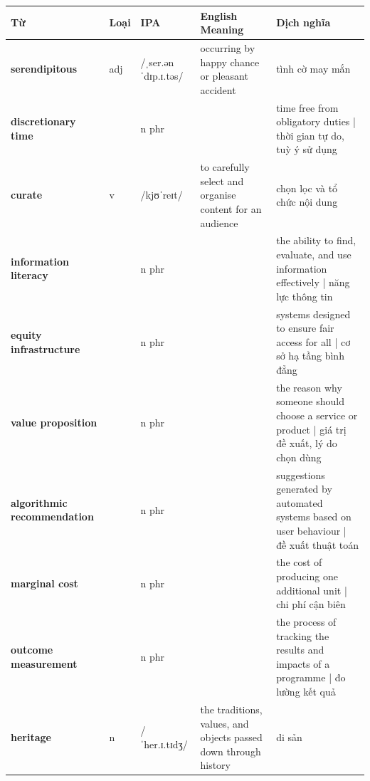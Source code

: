 \vspace{0.8em}
\begin{center}
\renewcommand{\arraystretch}{1.65}
\begin{tabularx}{\textwidth}{|V{0.22\textwidth}|C{0.07\textwidth}|I{0.20\textwidth}|Y|V{0.18\textwidth}|}
\hline
{}
\textbf{Từ} & \textbf{Loại} & \textbf{IPA} & \textbf{English Meaning} & \textbf{Dịch nghĩa} \\
\hline
\textbf{serendipitous} & adj & /ˌser.ənˈdɪp.ɪ.təs/ & occurring by happy chance or pleasant accident & tình cờ may mắn \\ \hline
\textbf{discretionary time} & & n phr & & time free from obligatory duties | thời gian tự do, tuỳ ý sử dụng \\ \hline
\textbf{curate} & v & /kjʊˈreɪt/ & to carefully select and organise content for an audience & chọn lọc và tổ chức nội dung \\ \hline
\textbf{information literacy} & & n phr & & the ability to find, evaluate, and use information effectively | năng lực thông tin \\ \hline
\textbf{equity infrastructure} & & n phr & & systems designed to ensure fair access for all | cơ sở hạ tầng bình đẳng \\ \hline
\textbf{value proposition} & & n phr & & the reason why someone should choose a service or product | giá trị đề xuất, lý do chọn dùng \\ \hline
\textbf{algorithmic recommendation} & & n phr & & suggestions generated by automated systems based on user behaviour | đề xuất thuật toán \\ \hline
\textbf{marginal cost} & & n phr & & the cost of producing one additional unit | chi phí cận biên \\ \hline
\textbf{outcome measurement} & & n phr & & the process of tracking the results and impacts of a programme | đo lường kết quả \\ \hline
\textbf{heritage} & n & /ˈher.ɪ.tɪdʒ/ & the traditions, values, and objects passed down through history & di sản \\ \hline
\end{tabularx}
\end{center}

\newpage

